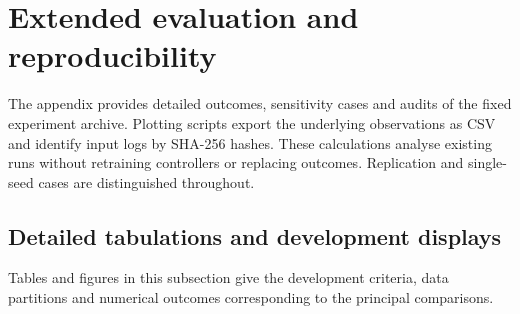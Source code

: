 \documentclass[preprint,12pt,a4paper]{elsarticle}
\begin{document}
\clearpage

\appendix
\setcounter{figure}{0}
\setcounter{table}{0}
\renewcommand{\theHfigure}{appendix.\arabic{figure}}
\renewcommand{\theHtable}{appendix.\arabic{table}}
\section{Extended evaluation and reproducibility}
\label{sec:appendix}
The appendix provides detailed outcomes, sensitivity cases and audits of the fixed experiment archive. Plotting scripts export the underlying observations as CSV and identify input logs by SHA-256 hashes. These calculations analyse existing runs without retraining controllers or replacing outcomes. Replication and single-seed cases are distinguished throughout.

\subsection{Detailed tabulations and development displays}
Tables and figures in this subsection give the development criteria, data partitions and numerical outcomes corresponding to the principal comparisons.

\begin{table}[htbp]
\centering\small
\caption{Development-set selection of FedGrid variants. Damage is in dollars over the validation weeks and uses a bill-plus-curtailment score. The post-hoc 4.0\% bound uses the rounded original rejection rate. Rejection pools differ: 21 original runs versus 15 per complete candidate. The last column is the mean of per-run maximum honest-household rejection, not the maximum across runs.}
\label{tab:selection_candidates}
\end{table}
\end{document}
